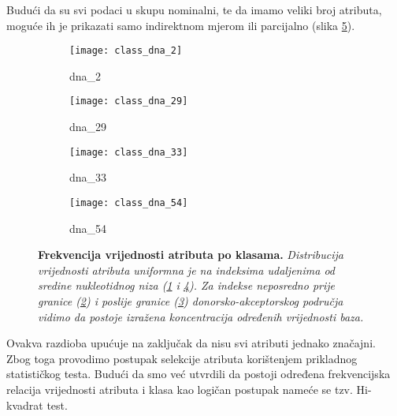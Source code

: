Budući da su svi podaci u skupu nominalni, te da imamo veliki broj atributa, moguće ih je prikazati samo indirektnom mjerom ili parcijalno (slika \ref{fig:class_dna_x}).
\begin{center}
   \begin{figure}[ht!]
   \begin{subfigure}{.5\textwidth}
         \texttt{[image: class\_dna\_2]}
         \caption{dna{\_}2}
         \label{fig:class_dna_2}
   \end{subfigure}
   \begin{subfigure}{.5\textwidth}
         \texttt{[image: class\_dna\_29]}
         \caption{dna{\_}29}
         \label{fig:class_dna_29}
   \end{subfigure}
   \begin{subfigure}{.5\textwidth}
         \texttt{[image: class\_dna\_33]}
         \caption{dna{\_}33}
         \label{fig:class_dna_33}
   \end{subfigure}
   \begin{subfigure}{.5\textwidth}
         \texttt{[image: class\_dna\_54]}
         \caption{dna{\_}54}
         \label{fig:class_dna_54}
   \end{subfigure}
   \caption[Dijagram rasipanja vrijednosti atributa po klasama]
   {\textbf{Frekvencija vrijednosti atributa po klasama.}\textit{ Distribucija vrijednosti atributa uniformna je na indeksima udaljenima od sredine nukleotidnog niza (\ref{fig:class_dna_2} i \ref{fig:class_dna_54}). Za indekse neposredno prije granice (\ref{fig:class_dna_29}) i poslije granice (\ref{fig:class_dna_33}) donorsko-akceptorskog područja vidimo da postoje izražena koncentracija određenih vrijednosti baza.}}
    \label{fig:class_dna_x}
   \end{figure}
\end{center}
Ovakva razdioba upućuje na zaključak da nisu svi atributi jednako značajni. Zbog toga provodimo postupak selekcije atributa korištenjem prikladnog statističkog testa. Budući da smo već utvrdili da postoji određena frekvencijska relacija vrijednosti atributa i klasa kao logičan postupak nameće se tzv. Hi-kvadrat test.
